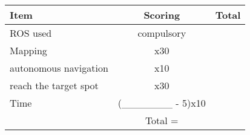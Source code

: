 \documentclass[10pt,a4paper]{article}
\begin{document}
		\begin{table}[ht]
			\begin{tabular}{|l|c|r|}
				\hline
				Item & Scoring & Total \\ 
				\hline
				ROS used & compulsory &  \\ 
				\hline
				Mapping & x30 &  \\ 
				\hline
				autonomous navigation & x10 &  \\ 
				\hline
				reach the target spot & x30 &  \\ 
				\hline
				Time & (\_\_\_\_\_\_\_ - 5)x10 &  \\ 
				\hline
				& Total  = & \\
				\hline
			\end{tabular} 
		\end{table}		
		
	
	
	
\end{document}
